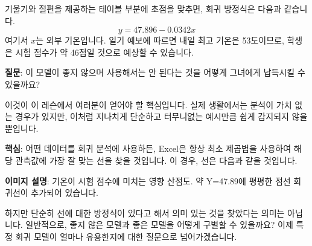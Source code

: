 \documentclass[11pt,a4paper]{book}
\theoremstyle{definition}
\begin{document}
\begin{tcolorbox}[examplebox, title={예시: 기온이 시험 점수에 미치는 영향}]
기울기와 절편을 제공하는 테이블 부분에 초점을 맞추면, 회귀 방정식은 다음과 같습니다.
\begin{equation*}
y = 47.896 - 0.0342x
\end{equation*}
여기서 $x$는 외부 기온입니다. 일기 예보에 따르면 내일 최고 기온은 53도이므로, 학생은 시험 점수가 약 46점일 것으로 예상할 수 있습니다.

\textbf{질문}: 이 모델이 좋지 않으며 사용해서는 안 된다는 것을 어떻게 그녀에게 납득시킬 수 있을까요?

이것이 이 레슨에서 여러분이 얻어야 할 핵심입니다. 실제 생활에서는 분석이 가치 없는 경우가 있지만, 이처럼 지나치게 단순하고 터무니없는 예시만큼 쉽게 감지되지 않을 뿐입니다.

\textbf{핵심}: 어떤 데이터를 회귀 분석에 사용하든, Excel은 항상 최소 제곱법을 사용하여 해당 관측값에 가장 잘 맞는 선을 찾을 것입니다. 이 경우, 선은 다음과 같을 것입니다.

\begin{center}
\end{center}
\textbf{이미지 설명}: 기온이 시험 점수에 미치는 영향 산점도. 약 Y=47.89에 평평한 점선 회귀선이 추가되어 있습니다.

하지만 단순히 선에 대한 방정식이 있다고 해서 의미 있는 것을 찾았다는 의미는 아닙니다. 일반적으로, 좋지 않은 모델과 좋은 모델을 어떻게 구별할 수 있을까요? 이제 특정 회귀 모델이 얼마나 유용한지에 대한 질문으로 넘어가겠습니다.
\end{tcolorbox}
\end{document}
